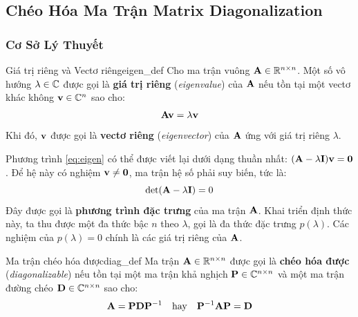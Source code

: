\subsection{Chéo Hóa Ma Trận \- Matrix Diagonalization}

\subsubsection{Cơ Sở Lý Thuyết}


\begin{mydef}{Giá trị riêng và Vectơ riêng}{eigen_def}
Cho ma trận vuông $\mathbf{A} \in \mathbb{R}^{n \times n}$. Một số vô hướng $\lambda \in \mathbb{C}$ được gọi là \textbf{giá trị riêng} (\textit{eigenvalue}) của $\mathbf{A}$ nếu tồn tại một vectơ khác không $\mathbf{v} \in \mathbb{C}^n$ sao cho:
\begin{equation}
    \mathbf{A}\mathbf{v} = \lambda\mathbf{v}
    \label{eq:eigen}
\end{equation}
Khi đó, $\mathbf{v}$ được gọi là \textbf{vectơ riêng} (\textit{eigenvector}) của $\mathbf{A}$ ứng với giá trị riêng $\lambda$.
\end{mydef}

Phương trình \eqref{eq:eigen} có thể được viết lại dưới dạng thuần nhất: $(\mathbf{A} - \lambda\mathbf{I})\mathbf{v} = \mathbf{0}$. Để hệ này có nghiệm $\mathbf{v} \neq \mathbf{0}$, ma trận hệ số phải suy biến, tức là:
\begin{equation}
    \det(\mathbf{A} - \lambda\mathbf{I}) = 0
\end{equation}
Đây được gọi là \textbf{phương trình đặc trưng} của ma trận $\mathbf{A}$. Khai triển định thức này, ta thu được một đa thức bậc $n$ theo $\lambda$, gọi là đa thức đặc trưng $p(\lambda)$. Các nghiệm của $p(\lambda) = 0$ chính là các giá trị riêng của $\mathbf{A}$.


\begin{mydef}{Ma trận chéo hóa được}{diag_def}
Ma trận $\mathbf{A} \in \mathbb{R}^{n \times n}$ được gọi là \textbf{chéo hóa được} (\textit{diagonalizable}) nếu tồn tại một ma trận khả nghịch $\mathbf{P} \in \mathbb{C}^{n \times n}$ và một ma trận đường chéo $\mathbf{D} \in \mathbb{C}^{n \times n}$ sao cho:
\begin{equation}
    \mathbf{A} = \mathbf{P}\mathbf{D}\mathbf{P}^{-1} \quad \text{hay} \quad \mathbf{P}^{-1}\mathbf{A}\mathbf{P} = \mathbf{D}
\end{equation}
\end{mydef}

